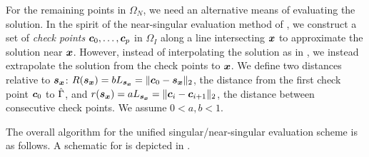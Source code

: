 For the remaining points in $\Omega_N$, we need an alternative means of evaluating the solution.
In the spirit of the near-singular evaluation method of \cite{YBZ},  we construct a set of \textit{check points} ${\bm{c}}_0, \hdots, {\bm{c}}_p$ in $\Omega_I$ along a line intersecting ${\bm{x}}$ to approximate the solution near ${\bm{x}}$. 
However, instead of interpolating the solution as in \cite{YBZ}, we instead extrapolate the solution from the check points to ${\bm{x}}$.
We define two distances relative to ${\bm{s}_{\bm{x}}}$: $R({\bm{s}_{\bm{x}}}) =b L_{\bm{s}_{\bm{x}}} = \|{\bm{c}}_0 - {\bm{s}_{\bm{x}}}\|_2$, the distance from the first check point ${\bm{c}}_0$ to $\hat{\Gamma}$,  and $r({\bm{s}_{\bm{x}}}) =a L_{\bm{s}_{\bm{x}}} = \|{\bm{c}}_i - {\bm{c}}_{i+1}\|_2$, the distance between consecutive check points.
We assume  $0<a,b <1$.

The overall algorithm for the unified singular/near-singular evaluation scheme is as follows.
A schematic for \qbkix is depicted in .


